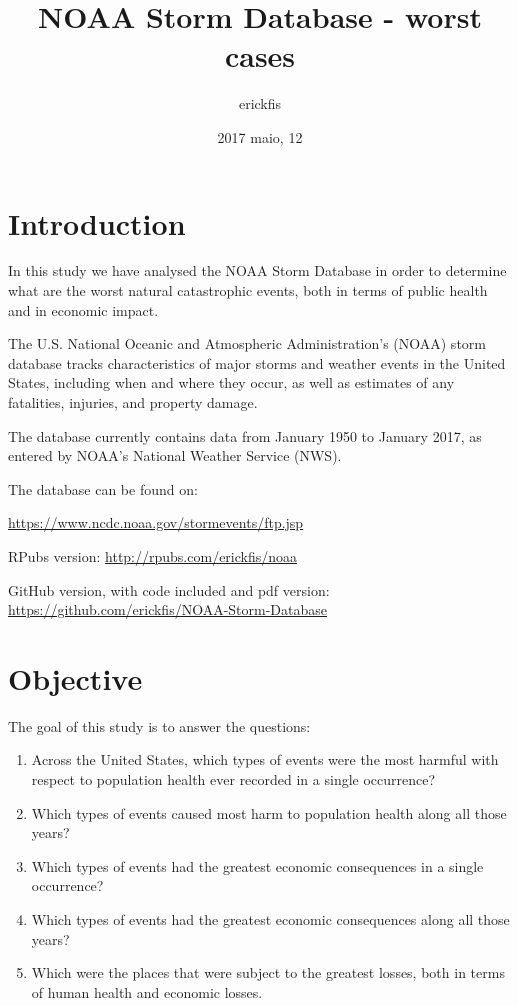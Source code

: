 \documentclass[]{article}
\title{NOAA Storm Database - worst cases}
\author{erickfis}
\date{2017 maio, 12}
\begin{document}
\maketitle

{
\setcounter{tocdepth}{3}
\tableofcontents
}
\newpage

\section{Introduction}\label{introduction}

In this study we have analysed the NOAA Storm Database in order to
determine what are the worst natural catastrophic events, both in terms
of public health and in economic impact.

The U.S. National Oceanic and Atmospheric Administration's (NOAA) storm
database tracks characteristics of major storms and weather events in
the United States, including when and where they occur, as well as
estimates of any fatalities, injuries, and property damage.

The database currently contains data from January 1950 to January 2017,
as entered by NOAA's National Weather Service (NWS).

The database can be found on:

\url{https://www.ncdc.noaa.gov/stormevents/ftp.jsp}

RPubs version: \url{http://rpubs.com/erickfis/noaa}

GitHub version, with code included and pdf version:
\url{https://github.com/erickfis/NOAA-Storm-Database}

\section{Objective}\label{objective}

The goal of this study is to answer the questions:

\begin{enumerate}
\def\labelenumi{\arabic{enumi}.}
\item
  Across the United States, which types of events were the most harmful
  with respect to population health ever recorded in a single
  occurrence?
\item
  Which types of events caused most harm to population health along all
  those years?
\item
  Which types of events had the greatest economic consequences in a
  single occurrence?
\item
  Which types of events had the greatest economic consequences along all
  those years?
\item
  Which were the places that were subject to the greatest losses, both
  in terms of human health and economic losses.
\end{enumerate}
\end{document}
